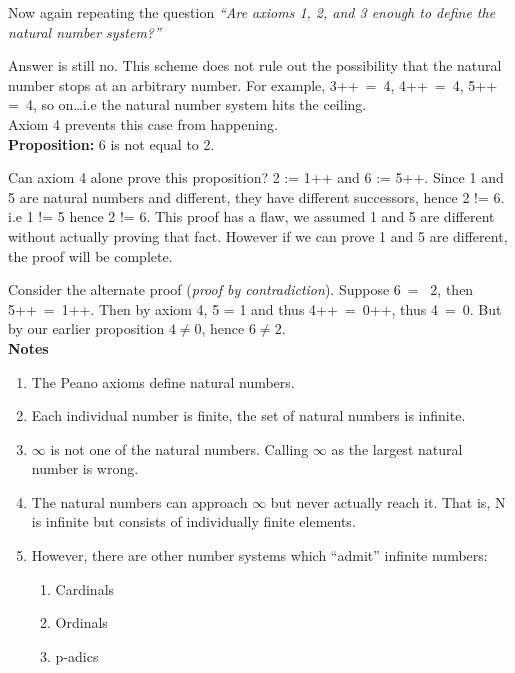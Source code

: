 \documentclass[10pt]{article}
\begin{document}
Now again repeating the question \emph{``Are axioms 1, 2, and 3 enough to define
the natural number system?''}

Answer is still no. This scheme does not rule out the possibility that the
natural number stops at an arbitrary number. For example, 3++~=~4, 4++~=~4, 5++~
=~4, so on\dots i.e the natural number system hits the ceiling.
\\[4pt]
Axiom 4 prevents this case from happening.
\\[4pt]
\textbf{Proposition:} 6 is not equal to 2.

Can axiom 4 alone prove this proposition? 2 := 1++ and 6 := 5++. Since 1 and 5
are natural numbers and different, they have different successors, hence 2 !=
6. i.e 1 != 5 hence 2 != 6.
This proof has a flaw, we assumed 1 and 5 are different without actually proving
that fact. However if we can prove 1 and 5 are different, the proof will be
complete.

Consider the alternate proof (\emph{proof by contradiction}). Suppose 6~=~
2, then 5++~=~1++. Then by axiom 4, 5 = 1 and thus 4++~=~0++, thus 4~=~0. But by
our earlier proposition $4 \ne 0$, hence $6 \ne 2$.
\\[6pt]
\textbf{\large{Notes}}
\begin{enumerate}
\item The Peano axioms define natural numbers.
\item Each individual number is finite, the set of natural numbers is infinite.
\item $\infty$ is not one of the natural numbers. Calling $\infty$ as the
      largest natural number is wrong.
\item The natural numbers can approach $\infty$ but never actually reach it. That
   is, N is infinite but consists of individually finite elements.
\item However, there are other number systems which ``admit'' infinite numbers:
\begin{enumerate}
  \item Cardinals
  \item Ordinals
  \item p-adics
\end{enumerate}
\end{enumerate}
\end{document}

